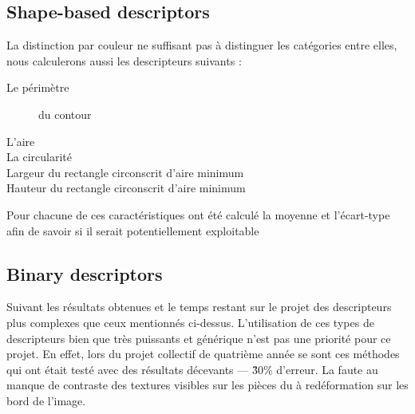         \subsection{Shape-based descriptors}
        
        La distinction par couleur ne suffisant pas à distinguer les catégories entre elles, nous calculerons aussi les descripteurs suivants :
        \begin{description}
            \item[Le périmètre] du contour
            \item[L'aire]
            \item[La circularité]
            \item[Largeur du rectangle circonscrit d'aire minimum]
            \item[Hauteur du rectangle circonscrit d'aire minimum]
        \end{description}
        
        Pour chacune de ces caractéristiques ont été calculé la moyenne et l'écart-type afin de savoir si il serait potentiellement exploitable 
        
        \subsection{Binary descriptors}
        Suivant les résultats obtenues et le temps restant sur le projet des descripteurs plus complexes que ceux mentionnés ci-dessus.
        L'utilisation de ces types de descripteurs bien que très puissants et générique n'est pas une priorité pour ce projet.
        En effet, lors du projet collectif de quatrième année se sont ces méthodes qui ont était testé avec des résultats décevants --- \~30\% d'erreur.
        La faute au manque de contraste des textures visibles sur les pièces du à redéformation sur les bord de l'image.
        
 




    
        